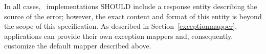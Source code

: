 In all cases, \jaxrs\ implementations SHOULD include a response entity describing the source of the error; however, the exact content and format of this entity is beyond the scope of this specification. As described in Section~\ref{exceptionmapper}, applications can provide their own exception mappers and, consequently, customize the default mapper described above.





